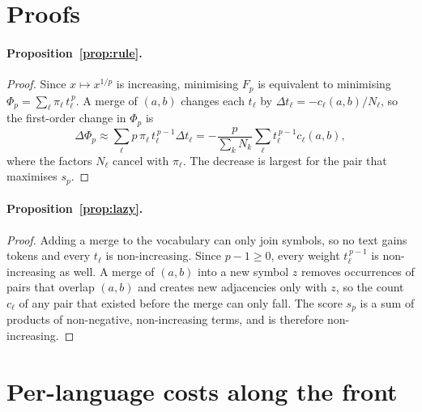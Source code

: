 \section{Proofs}
\label{app:proofs}

\paragraph{Proposition~\ref{prop:rule}.}
\begin{proof}
Since $x\mapsto x^{1/p}$ is increasing, minimising $F_p$ is equivalent to minimising
$\Phi_p=\sum_\ell \pi_\ell\, t_\ell^{\,p}$. A merge of $(a,b)$ changes each $t_\ell$ by
$\Delta t_\ell = -c_\ell(a,b)/N_\ell$, so the first-order change in $\Phi_p$ is
\begin{equation*}
  \Delta\Phi_p \approx \sum_\ell p\,\pi_\ell\, t_\ell^{\,p-1}\Delta t_\ell
  = -\frac{p}{\sum_k N_k}\sum_\ell t_\ell^{\,p-1} c_\ell(a,b),
\end{equation*}
where the factors $N_\ell$ cancel with $\pi_\ell$. The decrease is largest for the pair
that maximises $s_p$.
\end{proof}

\paragraph{Proposition~\ref{prop:lazy}.}
\begin{proof}
Adding a merge to the vocabulary can only join symbols, so no text gains tokens and every
$t_\ell$ is non-increasing. Since $p-1\ge0$, every weight $t_\ell^{\,p-1}$ is
non-increasing as well. A merge of $(a,b)$ into a new symbol $z$ removes occurrences of
pairs that overlap $(a,b)$ and creates new adjacencies only with $z$, so the count
$c_\ell$ of any pair that existed before the merge can only fall. The score $s_p$ is a sum of
products of non-negative, non-increasing terms, and is therefore non-increasing.
\end{proof}

\section{Per-language costs along the front}
\label{app:perlang}


